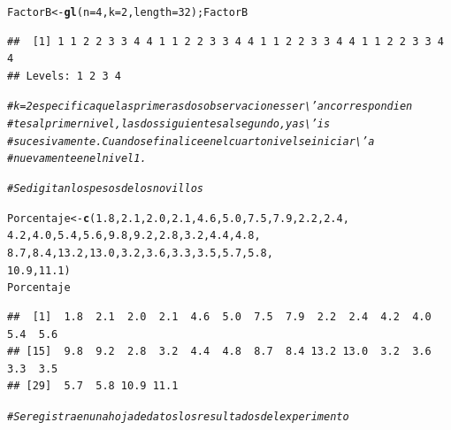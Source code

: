 \documentclass[12pt,letterpaper]{article}\usepackage[]{graphicx}\usepackage[]{color}
\makeatletter
\newcommand{\hlnum}[1]{\textcolor[rgb]{0.686,0.059,0.569}{#1}}%
\newcommand{\hlcom}[1]{\textcolor[rgb]{0.678,0.584,0.686}{\textit{#1}}}%
\newcommand{\hlstd}[1]{\textcolor[rgb]{0.345,0.345,0.345}{#1}}%
\newcommand{\hlkwb}[1]{\textcolor[rgb]{0.69,0.353,0.396}{#1}}%
\newcommand{\hlkwc}[1]{\textcolor[rgb]{0.333,0.667,0.333}{#1}}%
\newcommand{\hlkwd}[1]{\textcolor[rgb]{0.737,0.353,0.396}{\textbf{#1}}}%
\newenvironment{kframe}{%
 \def\at@end@of@kframe{}%
 \ifinner\ifhmode%
  \def\at@end@of@kframe{\end{minipage}}%
  \begin{minipage}{\columnwidth}%
 \fi\fi%
 \def\FrameCommand##1{\hskip\@totalleftmargin \hskip-\fboxsep
 \colorbox{shadecolor}{##1}\hskip-\fboxsep
     \hskip-\linewidth \hskip-\@totalleftmargin \hskip\columnwidth}%
 \MakeFramed {\advance\hsize-\width
   \@totalleftmargin\z@ \linewidth\hsize
   \@setminipage}}%
 {\par\unskip\endMakeFramed%
 \at@end@of@kframe}
\newenvironment{knitrout}{}{} %
\makeatother
\begin{document}
\begin{itemize}
\begin{knitrout}
\begin{kframe}
\begin{alltt}
\hlstd{FactorB}\hlkwb{<-} \hlkwd{gl}\hlstd{(}\hlkwc{n}\hlstd{=}\hlnum{4}\hlstd{,} \hlkwc{k}\hlstd{=}\hlnum{2}\hlstd{,}\hlkwc{length}\hlstd{=}\hlnum{32}\hlstd{);FactorB}
\end{alltt}
\begin{verbatim}
##  [1] 1 1 2 2 3 3 4 4 1 1 2 2 3 3 4 4 1 1 2 2 3 3 4 4 1 1 2 2 3 3 4 4
## Levels: 1 2 3 4
\end{verbatim}
\begin{alltt}
\hlcom{# k=2 especifica que las primeras dos observaciones ser\textbackslash{}'an correspondien}
\hlcom{# tes al primer nivel, las dos siguientes al segundo, y as\textbackslash{}'is }
\hlcom{# sucesivamente. Cuando se finalice en el cuarto nivel se iniciar\textbackslash{}'a }
\hlcom{# nuevamente en el nivel 1. }

\hlcom{# Se digitan los pesos de los novillos }

\hlstd{Porcentaje} \hlkwb{<-} \hlkwd{c}\hlstd{(}\hlnum{1.8}\hlstd{,} \hlnum{2.1}\hlstd{,} \hlnum{2.0}\hlstd{,} \hlnum{2.1}\hlstd{,} \hlnum{4.6}\hlstd{,} \hlnum{5.0}\hlstd{,} \hlnum{7.5}\hlstd{,} \hlnum{7.9}\hlstd{,} \hlnum{2.2}\hlstd{,} \hlnum{2.4}\hlstd{,}
                \hlnum{4.2}\hlstd{,} \hlnum{4.0}\hlstd{,} \hlnum{5.4}\hlstd{,} \hlnum{5.6}\hlstd{,} \hlnum{9.8}\hlstd{,} \hlnum{9.2}\hlstd{,} \hlnum{2.8}\hlstd{,} \hlnum{3.2}\hlstd{,} \hlnum{4.4}\hlstd{,} \hlnum{4.8}\hlstd{,}
                \hlnum{8.7}\hlstd{,} \hlnum{8.4}\hlstd{,} \hlnum{13.2}\hlstd{,} \hlnum{13.0}\hlstd{,} \hlnum{3.2}\hlstd{,} \hlnum{3.6}\hlstd{,} \hlnum{3.3}\hlstd{,} \hlnum{3.5}\hlstd{,} \hlnum{5.7}\hlstd{,} \hlnum{5.8}\hlstd{,}
                \hlnum{10.9}\hlstd{,} \hlnum{11.1}\hlstd{)}
\hlstd{Porcentaje}
\end{alltt}
\begin{verbatim}
##  [1]  1.8  2.1  2.0  2.1  4.6  5.0  7.5  7.9  2.2  2.4  4.2  4.0  5.4  5.6
## [15]  9.8  9.2  2.8  3.2  4.4  4.8  8.7  8.4 13.2 13.0  3.2  3.6  3.3  3.5
## [29]  5.7  5.8 10.9 11.1
\end{verbatim}
\begin{alltt}
\hlcom{# Se registra en una hoja de datos los resultados del experimento }


\end{alltt}
\end{kframe}
\end{knitrout}
\end{itemize}
\end{document}
